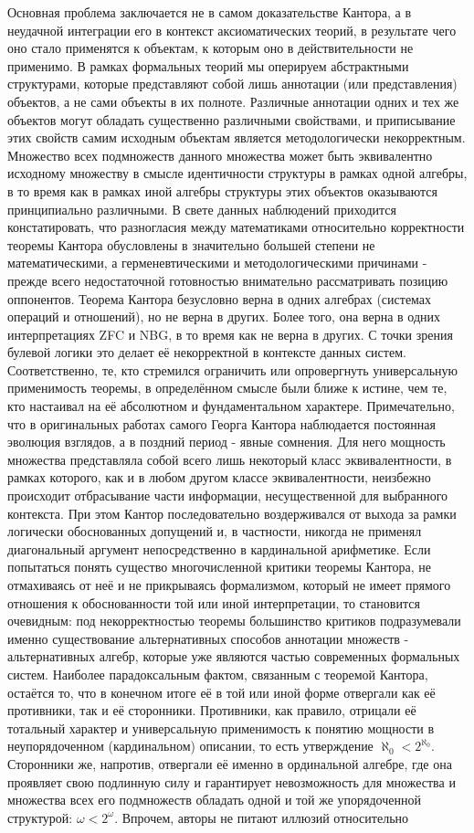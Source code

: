 \documentclass[12pt]{article}
\begin{document}
Основная проблема заключается не в самом доказательстве Кантора, а в неудачной интеграции его в контекст аксиоматических теорий, в результате чего оно стало применятся к объектам, к которым оно в действительности не применимо. В рамках формальных теорий мы оперируем абстрактными структурами, которые представляют собой лишь аннотации (или представления) объектов, а не сами объекты в их полноте. Различные аннотации одних и тех же объектов могут обладать существенно различными свойствами, и приписывание этих свойств самим исходным объектам является методологически некорректным. Множество всех подмножеств данного множества может быть эквивалентно исходному множеству в смысле идентичности структуры в рамках одной алгебры, в то время как в рамках иной алгебры структуры этих объектов оказываются принципиально различными. В свете данных наблюдений приходится констатировать, что разногласия между математиками относительно корректности теоремы Кантора обусловлены в значительно большей степени не математическими, а герменевтическими и методологическими причинами - прежде всего недостаточной готовностью внимательно рассматривать позицию оппонентов. Теорема Кантора безусловно верна в одних алгебрах (системах операций и отношений), но не верна в других. Более того, она верна в одних интерпретациях ZFC и NBG, в то время как не верна в других. С точки зрения булевой логики это делает её некорректной в контексте данных систем. Соответственно, те, кто стремился ограничить или опровергнуть универсальную применимость теоремы, в определённом смысле были ближе к истине, чем те, кто настаивал на её абсолютном и фундаментальном характере. Примечательно, что в оригинальных работах самого Георга Кантора наблюдается постоянная эволюция взглядов, а в поздний период - явные сомнения. Для него мощность множества представляла собой всего лишь некоторый класс эквивалентности, в рамках которого, как и в любом другом классе эквивалентности, неизбежно происходит отбрасывание части информации, несущественной для выбранного контекста. При этом Кантор последовательно воздерживался от выхода за рамки логически обоснованных допущений и, в частности, никогда не применял диагональный аргумент непосредственно в кардинальной арифметике. Если попытаться понять существо многочисленной критики теоремы Кантора, не отмахиваясь от неё и не прикрываясь формализмом, который не имеет прямого отношения к обоснованности той или иной интерпретации, то становится очевидным: под некорректностью теоремы большинство критиков подразумевали именно существование альтернативных способов аннотации множеств - альтернативных алгебр, которые уже являются частью современных формальных систем. Наиболее парадоксальным фактом, связанным с теоремой Кантора, остаётся то, что в конечном итоге её в той или иной форме отвергали как её противники, так и её сторонники. Противники, как правило, отрицали её тотальный характер и универсальную применимость к понятию мощности в неупорядоченном (кардинальном) описании, то есть утверждение $\aleph_0 < 2^{\aleph_0}$. Сторонники же, напротив, отвергали её именно в ординальной алгебре, где она проявляет свою подлинную силу и гарантирует невозможность для множества и множества всех его подмножеств обладать одной и той же упорядоченной структурой: $\omega < 2^\omega$. Впрочем, авторы не питают иллюзий относительно 
\end{document}
